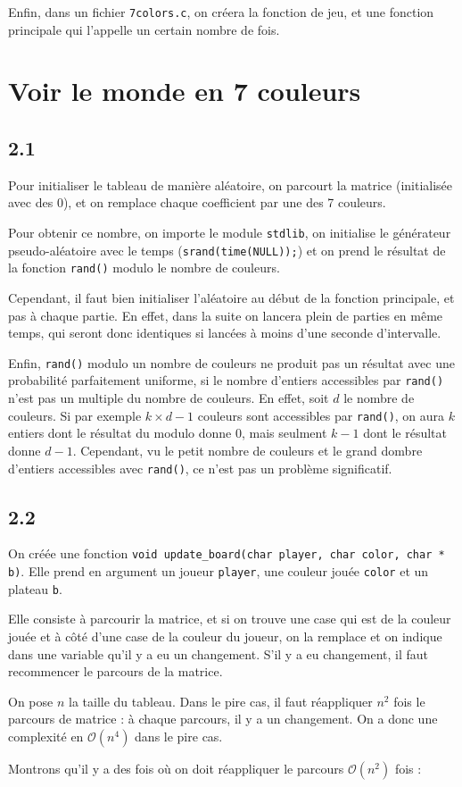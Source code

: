 \documentclass[12pt]{article}
\def\question#1{\subsection{#1}}
\def\sec#1{\section{#1}}
\begin{document}
Enfin, dans un fichier \texttt{7colors.c}, on créera la fonction de jeu, et une fonction principale qui l'appelle un certain nombre de fois.




\sec{Voir le monde en 7 couleurs}
\question{2.1} 
Pour initialiser le tableau de manière aléatoire, on parcourt la matrice (initialisée avec des 0), et on remplace chaque coefficient par une des 7 couleurs.

Pour obtenir ce nombre, on importe le module \texttt{stdlib}, on initialise le générateur pseudo-aléatoire avec le temps (\texttt{srand(time(NULL));}) et on prend le résultat de la fonction \texttt{rand()} modulo le nombre de couleurs.

Cependant, il faut bien initialiser l'aléatoire au début de la fonction principale, et pas à chaque partie. En effet, dans la suite on lancera plein de parties en même temps, qui seront donc identiques si lancées à moins d'une seconde d'intervalle.

Enfin, \texttt{rand()} modulo un nombre de couleurs ne produit pas un résultat avec une probabilité parfaitement uniforme, si le nombre d'entiers accessibles par \texttt{rand()} n'est pas un multiple du nombre de couleurs. En effet, soit $d$ le nombre de couleurs. Si par exemple $k\times d - 1$ couleurs sont accessibles par \texttt{rand()}, on aura $k$ entiers dont le résultat du modulo donne 0, mais seulment $k-1$ dont le résultat donne $d-1$.
Cependant, vu le petit nombre de couleurs et le grand dombre d'entiers accessibles avec \texttt{rand()}, ce n'est pas un problème significatif.

\question{2.2}
On créée une fonction \texttt{void update\_board(char player, char color, char * b)}. Elle prend en argument un joueur \texttt{player}, une couleur jouée \texttt{color} et un plateau \texttt{b}.

Elle consiste à parcourir la matrice, et si on trouve une case qui est de la couleur jouée et à côté d'une case de la couleur du joueur, on la remplace et on indique dans une variable qu'il y a eu un changement.
S'il y a eu changement, il faut recommencer le parcours de la matrice.

On pose $n$ la taille du tableau. Dans le pire cas, il faut réappliquer $n^2$ fois le parcours de matrice : à chaque parcours, il y a un changement. On a donc une complexité en $\mathcal{O}(n^4)$ dans le pire cas.

Montrons qu'il y a des fois où on doit réappliquer le parcours $\mathcal{O}(n^2)$ fois :
\end{document}
